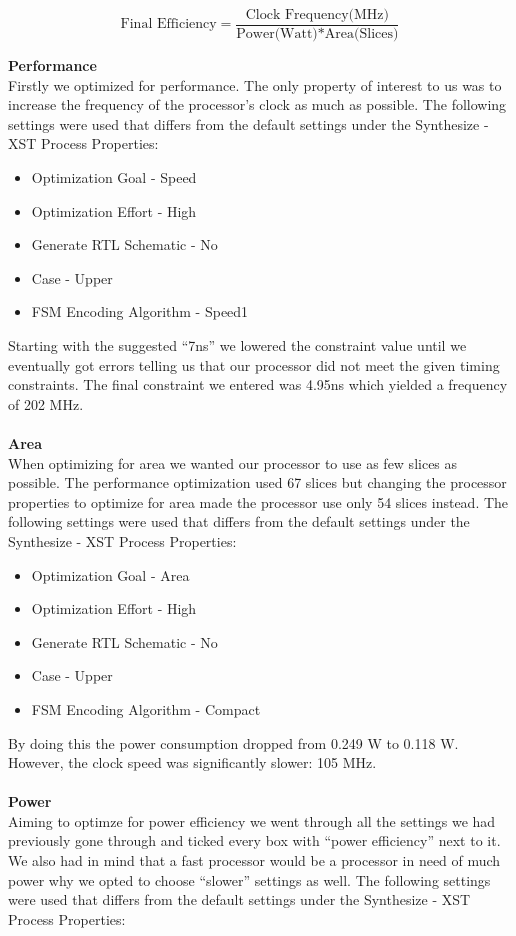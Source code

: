 \documentclass[a4paper,11pt]{article}
\begin{document}
$$ \text{Final Efficiency} = 
\frac{\text{Clock Frequency(MHz)}}{\text{Power(Watt)*Area(Slices)}}$$

\noindent
{\bf Performance}\\
\noindent
Firstly we optimized for performance. The only property of interest to us was 
to increase the frequency of the processor's clock as much as possible. The 
following settings were used that differs from the default settings under the 
Synthesize - XST Process Properties:

\begin{itemize}
\item Optimization Goal - Speed
\item Optimization Effort - High
\item Generate RTL Schematic - No
\item Case - Upper
\item FSM Encoding Algorithm - Speed1
\end{itemize}

Starting with the suggested ``7ns'' we lowered the constraint value until we 
eventually got errors telling us that our processor did not meet the given 
timing constraints. The final constraint we entered was 4.95ns which yielded 
a frequency of 202 MHz.\\\\
\noindent
{\bf Area}\\
\noindent
When optimizing for area we wanted our processor to use as few slices as 
possible. The performance optimization used 67 slices but changing the 
processor properties to optimize for area made the processor use only 54 
slices instead. The following settings were used that differs from the 
default settings under the Synthesize - XST Process Properties:

\begin{itemize}
\item Optimization Goal - Area
\item Optimization Effort - High
\item Generate RTL Schematic - No
\item Case - Upper
\item FSM Encoding Algorithm - Compact
\end{itemize}

By doing this the power consumption dropped from 0.249 W to 0.118 W. 
However, the clock speed was significantly slower: 105 MHz.\\\\
\noindent
{\bf Power}\\
\noindent
Aiming to optimze for power efficiency we went through all the settings we 
had previously gone through and ticked every box with ``power efficiency'' next 
to it. We also had in mind that a fast processor would be a processor in need 
of much power why we opted to choose ``slower'' settings as well. The following 
settings were used that differs from the default settings under the 
Synthesize - XST Process Properties:
\end{document}

